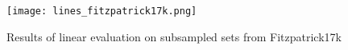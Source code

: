 \begin{figure}[H]
    \begin{center}
    \texttt{[image: lines\_fitzpatrick17k.png]}
    \caption{Results of linear evaluation on subsampled sets from Fitzpatrick17k}\label{fig:lines_fitzpatrick17k}
    \end{center}
\end{figure}


